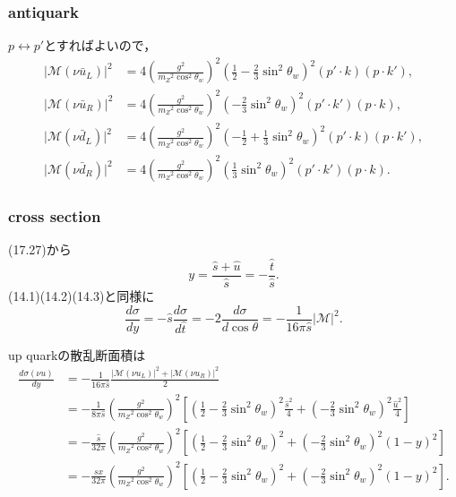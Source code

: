 \subsubsection{antiquark}
\(p \leftrightarrow p'\)とすればよいので，
\begin{align*}
  \lvert\mathcal{M}(\nu\bar{u}_L)\rvert^2
  &= 4 \left(\frac{g^2}{m_Z{}^2\cos^2\theta_w}\right)^2
  \left(\frac{1}{2} - \frac{2}{3}\sin^2\theta_w\right)^2
  (p'\cdot k)(p\cdot k') , \\
  \lvert\mathcal{M}(\nu\bar{u}_R)\rvert^2
  &= 4 \left(\frac{g^2}{m_Z{}^2\cos^2\theta_w}\right)^2
  \left( - \frac{2}{3}\sin^2\theta_w\right)^2
  (p'\cdot k')(p\cdot k) , \\
  \lvert\mathcal{M}(\nu\bar{d}_L)\rvert^2
  &= 4 \left(\frac{g^2}{m_Z{}^2\cos^2\theta_w}\right)^2
  \left(-\frac{1}{2} + \frac{1}{3}\sin^2\theta_w\right)^2
  (p'\cdot k)(p\cdot k') , \\
  \lvert\mathcal{M}(\nu\bar{d}_R)\rvert^2
  &= 4 \left(\frac{g^2}{m_Z{}^2\cos^2\theta_w}\right)^2
  \left(\frac{1}{3}\sin^2\theta_w\right)^2
  (p'\cdot k')(p\cdot k) .
\end{align*}

\subsubsection{cross section}
(17.27)から
\[ y = \frac{\hat{s}+\hat{u}}{\hat{s}} = - \frac{\hat{t}}{\hat{s}} . \]
(14.1)(14.2)(14.3)と同様に
\[
\frac{d\sigma}{dy} = - \hat{s} \frac{d\sigma}{d\hat{t}} = - 2 \frac{d\sigma}{d\cos\theta}
= - \frac{1}{16\pi \hat{s}} \lvert\mathcal{M}\rvert^2 .
\]

up quarkの散乱断面積は
\begin{align*}
  \frac{d\sigma(\nu u)}{dy}
  &= - \frac{1}{16\pi \hat{s}} \frac{\lvert\mathcal{M}(\nu u_L)\rvert^2 + \lvert\mathcal{M}(\nu u_R)\rvert^2}{2} \\
  &= - \frac{1}{8\pi \hat{s}} \left(\frac{g^2}{m_Z{}^2\cos^2\theta_w}\right)^2
  \left[ \left(\frac{1}{2} - \frac{2}{3}\sin^2\theta_w\right)^2 \frac{\hat{s}^2}{4}
  + \left( - \frac{2}{3}\sin^2\theta_w\right)^2 \frac{\hat{u}^2}{4} \right] \\
  &= - \frac{\hat{s}}{32\pi} \left(\frac{g^2}{m_Z{}^2\cos^2\theta_w}\right)^2
  \left[ \left(\frac{1}{2} - \frac{2}{3}\sin^2\theta_w\right)^2
  + \left( - \frac{2}{3}\sin^2\theta_w\right)^2 (1-y)^2 \right] \\
  &= - \frac{sx}{32\pi} \left(\frac{g^2}{m_Z{}^2\cos^2\theta_w}\right)^2
  \left[ \left(\frac{1}{2} - \frac{2}{3}\sin^2\theta_w\right)^2
  + \left( - \frac{2}{3}\sin^2\theta_w\right)^2 (1-y)^2 \right] .
\end{align*}

